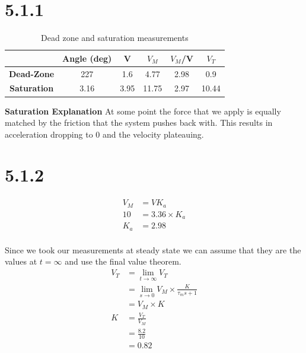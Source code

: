 \documentclass{article}
\begin{document}


\section*{5.1.1} %
\label{sec:5_1_1}


\begin{table}[!htbp]
\centering
    \begin{tabular}{|c|c|c|c|c|c|}
        \hline
         & \textbf{Angle (deg)} & V & $V_M$ & $V_M$/V & $V_T$ \\
         \hline
         \textbf{Dead-Zone} & 227 & 1.6 & 4.77 & 2.98 & 0.9\\
         \hline
         \textbf{Saturation} & 3.16 & 3.95 & 11.75 & 2.97 & 10.44\\
        \hline
    \end{tabular}
    \caption{Dead zone and saturation measurements}
\end{table}

\textbf{Saturation Explanation}
At some point the force that we apply is equally matched by the friction that the system pushes back with. This results in acceleration dropping to 0 and the velocity plateauing.

\section*{5.1.2} %
\label{sec:5_1_2}

\begin{align*}
    V_M &= VK_a\\
    10 &= 3.36 \times K_a\\
    K_a &= 2.98\\
\end{align*}

Since we took our measurements at steady state we can assume that they are the values at $t = \infty$ and use the final value theorem.
\begin{align*}
    V_T &= \lim_{t\to \infty} V_T\\
        &= \lim_{s\to 0} V_M \times \frac{K}{\tau_m s + 1}\\
        &= V_M \times K\\
    K &= \frac{V_T}{V_M}\\
         &= \frac{8.2}{10}\\
         &= 0.82\\
\end{align*}
\end{document}
